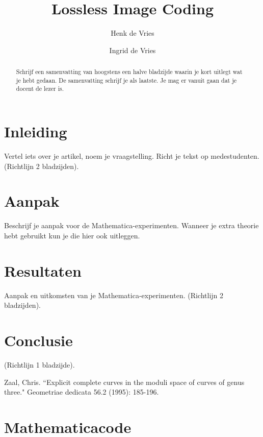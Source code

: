\documentclass[complatex]{uvamath}
\title{Lossless Image Coding}
\author[henk@science.uva.nl, 6127901]{Henk de Vries}
\author[ingrid@science.uva.nl, 6123102]{Ingrid de Vries}
\begin{document}
\maketitle

\begin{abstract}
Schrijf een samenvatting van hoogstens een halve bladzijde waarin je kort uitlegt wat je hebt gedaan. De samenvatting schrijf je als laatste. Je mag er vanuit gaan dat je docent de lezer is.
\end{abstract}

\tableofcontents

\chapter{Inleiding}
Vertel iets over je artikel, noem je vraagstelling. Richt je tekst op medestudenten. (Richtlijn 2 bladzijden).

\chapter{Aanpak}
Beschrijf je aanpak voor de Mathematica-experimenten. Wanneer je extra theorie hebt gebruikt kun je die hier ook uitleggen.

\chapter{Resultaten}
Aanpak en uitkomsten van je Mathematica-experimenten. (Richtlijn 2 bladzijden).

\chapter{Conclusie}
(Richtlijn 1 bladzijde).

\clearpage%
\begin{thebibliography}{}
Zaal, Chris. ``Explicit complete curves in the moduli space of curves of genus three." Geometriae dedicata 56.2 (1995): 185-196.
\end{thebibliography}

\appendix

\chapter{Mathematicacode}
\end{document}
